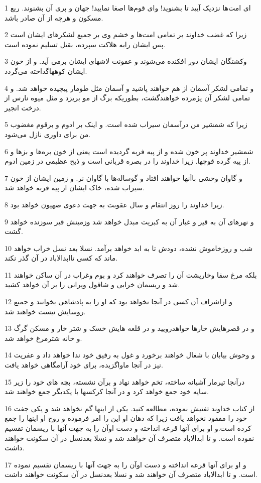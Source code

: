 \par 1 ای امت‌ها نزدیک آیید تا بشنوید! و‌ای قوم‌ها اصغا نمایید! جهان و پری آن بشنوند. ربع مسکون و هرچه از آن صادر باشد.
\par 2 زیرا که غضب خداوند بر تمامی امت‌ها و خشم وی بر جمیع لشکرهای ایشان است پس ایشان رابه هلاکت سپرده، بقتل تسلیم نموده است.
\par 3 وکشتگان ایشان دور افکنده می‌شوند و عفونت لاشهای ایشان برمی آید. و از خون ایشان کوههاگداخته می‌گردد.
\par 4 و تمامی لشکر آسمان از هم خواهند پاشید و آسمان مثل طومار پیچیده خواهد شد. و تمامی لشکر آن پژمرده خواهندگشت، بطوریکه برگ از مو بریزد و مثل میوه نارس از درخت انجیر.
\par 5 زیرا که شمشیر من درآسمان سیراب شده است. و اینک بر ادوم و برقوم مغضوب من برای داوری نازل می‌شود.
\par 6 شمشیر خداوند پر خون شده و از پیه فربه گردیده است یعنی از خون بره‌ها و بزها و از پیه گرده قوچها. زیرا خداوند را در بصره قربانی است و ذبح عظیمی در زمین ادوم.
\par 7 و گاوان وحشی باآنها خواهند افتاد و گوساله‌ها با گاوان نر. و زمین ایشان از خون سیراب شده، خاک ایشان از پیه فربه خواهد شد.
\par 8 زیرا خداوند را روز انتقام و سال عقوبت به جهت دعوی صهیون خواهد بود.
\par 9 و نهرهای آن به قیر و غبار آن به کبریت مبدل خواهد شد وزمینش قیر سوزنده خواهد گشت.
\par 10 شب و روزخاموش نشده، دودش تا به ابد خواهد برآمد. نسلا بعد نسل خراب خواهد ماند که کسی تاابدالاباد در آن گذر نکند.
\par 11 بلکه مرغ سقا وخارپشت آن را تصرف خواهند کرد و بوم وغراب در آن ساکن خواهند شد و ریسمان خرابی و شاقول ویرانی را بر آن خواهد کشید.
\par 12 و ازاشراف آن کسی در آنجا نخواهد بود که او را به پادشاهی بخوانند و جمیع روسایش نیست خواهند شد.
\par 13 و در قصرهایش خارها خواهدرویید و در قلعه هایش خسک و شتر خار و مسکن گرگ و خانه شترمرغ خواهد شد.
\par 14 و وحوش بیابان با شغال خواهند برخورد و غول به رفیق خود ندا خواهد داد و عفریت نیز در آنجا ماواگزیده، برای خود آرامگاهی خواهد یافت.
\par 15 درآنجا تیرمار آشیانه ساخته، تخم خواهد نهاد و برآن نشسته، بچه های خود را زیر سایه خود جمع خواهد کرد و در آنجا کرکسها با یکدیگر جمع خواهند شد.
\par 16 از کتاب خداوند تفتیش نموده، مطالعه کنید. یکی از اینها گم نخواهد شد و یکی جفت خود را مفقود نخواهد یافت زیرا که دهان او این را امر فرموده و روح او اینها را جمع کرده است.و او برای آنها قرعه انداخته و دست اوآن را به جهت آنها با ریسمان تقسیم نموده است. و تا ابدالاباد متصرف آن خواهند شد و نسلا بعدنسل در آن سکونت خواهند داشت.
\par 17 و او برای آنها قرعه انداخته و دست اوآن را به جهت آنها با ریسمان تقسیم نموده است. و تا ابدالاباد متصرف آن خواهند شد و نسلا بعدنسل در آن سکونت خواهند داشت.
 
